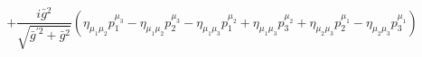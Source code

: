 %
\begin{dmath*}
%
  +  \frac{i {\bar g}{}^2}{\sqrt{{\bar g}^{\prime 2} + {\bar g}{}^2}} \left(\eta_{\mu_1 \mu_2} p_1^{\mu_3} - \eta_{\mu_1 \mu_2} p_2^{\mu_3} - \eta_{\mu_1 \mu_3} p_1^{\mu_2} + \eta_{\mu_1 \mu_3} p_3^{\mu_2} + \eta_{\mu_2 \mu_3} p_2^{\mu_1} - \eta_{\mu_2 \mu_3} p_3^{\mu_1}\right)
%
\end{dmath*}
%
